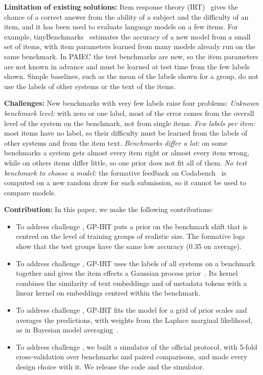 \documentclass{article}
\newcommand{\ch}[1]{\ding{\numexpr171+#1\relax}}
\begin{document}
\textbf{Limitation of existing solutions:} Item response theory (IRT)~\citep{lord2012applications} gives the chance of
a correct answer from the ability of a subject and the difficulty of an item, and it has been used to evaluate language
models on a few items. For example, tinyBenchmarks~\citep{polo2024tinybenchmarks} estimates the accuracy of a new model
from a small set of items, with item parameters learned from many models already run on the same benchmark. In PAIEC
the test benchmarks are new, so the item parameters are not known in advance and must be learned at test time from the
few labels shown. Simple baselines, such as the mean of the labels shown for a group, do not use the labels of other
systems or the text of the items.

\textbf{Challenges:} New benchmarks with very few labels raise four problems:
\ch{1} \emph{Unknown benchmark level:} with zero or one label, most of the error comes from the overall level of the
system on the benchmark, not from single items.
\ch{2} \emph{Few labels per item:} most items have no label, so their difficulty must be learned from the labels of
other systems and from the item text.
\ch{3} \emph{Benchmarks differ a lot:} on some benchmarks a system gets almost every item right or almost every item
wrong, while on others items differ little, so one prior does not fit all of them.
\ch{4} \emph{No test benchmark to choose a model:} the formative feedback on Codabench~\citep{xu2022codabench} is
computed on a new random draw for each submission, so it cannot be used to compare models.

\textbf{Contribution:} In this paper, we make the following contributions:
\begin{itemize}\itemsep0pt
\item To address challenge \ch{1}, GP-IRT puts a prior on the benchmark shift that is centred on the level of training
groups of realistic size. The formative logs show that the test groups have the same low accuracy (0.35 on average).
\item To address challenge \ch{2}, GP-IRT uses the labels of all systems on a benchmark together and gives the item
effects a Gaussian process prior~\citep{rasmussen2006gaussian}. Its kernel combines the similarity of text embeddings
and of metadata tokens with a linear kernel on embeddings centred within the benchmark.
\item To address challenge \ch{3}, GP-IRT fits the model for a grid of prior scales and averages the predictions, with
weights from the Laplace marginal likelihood, as in Bayesian model averaging~\citep{hoeting1999bayesian}.
\item To address challenge \ch{4}, we built a simulator of the official protocol, with 5-fold cross-validation over
benchmarks and paired comparisons, and made every design choice with it. We release the code and the simulator.
\end{itemize}
\end{document}
